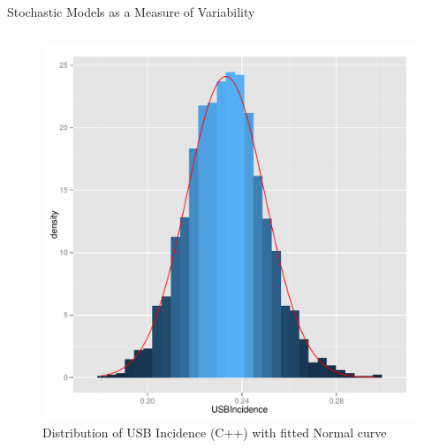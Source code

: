 \documentclass[final]{beamer}
\begin{document}
\begin{frame}
\begin{columns}
\begin{column}{.3\textwidth}
      \begin{block}{Stochastic Models as a Measure of Variability}
        \begin{block}{}
          \vspace{-2em}
          \begin{column}{.45\textwidth}
            \begin{figure}[h]
              \begin{center}
                \includegraphics[width=\textwidth]{IN0dist}
              \end{center}
              \caption{Distribution of USB Incidence (C++) with fitted Normal curve}
              \label{fig:IN0dist}
            \end{figure}
          \end{column}
          \begin{column}{.45\textwidth}
            \begin{figure}[h]
              \begin{center}

\end{center}
\end{figure}
\end{column}
\end{block}
\end{block}
\end{column}
\end{columns}
\end{frame}
\end{document}
